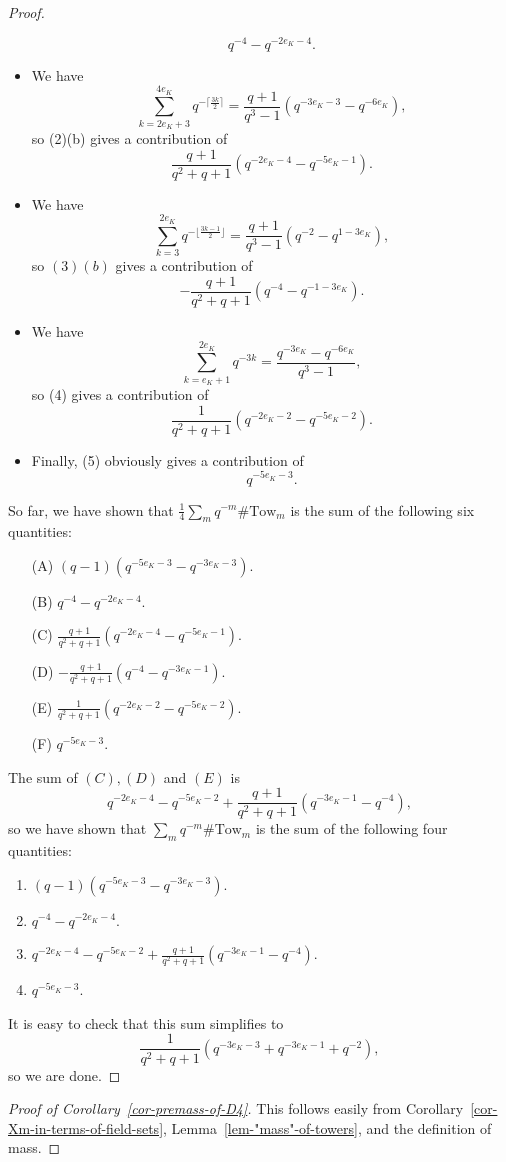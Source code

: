 \documentclass[11pt]{amsart}
\theoremstyle{theorem}
\theoremstyle{example}
\theoremstyle{definition}
\numberwithin{theorem}{section}
\numberwithin{theorem}{section}
\newcommand{\Tow}{\mathrm{Tow}}
\begin{document}
\begin{proof}
\begin{itemize}
        $$
        q^{-4} - q^{-2e_K - 4}.
        $$
        \item We have 
        $$
        \sum_{k=2e_K + 3}^{4e_K}q^{-\lceil\frac{3k}{2}\rceil} = \frac{q+1}{q^3-1}(q^{-3e_K - 3} - q^{-6e_K}),
        $$
        so (2)(b) gives a contribution of 
        $$
        \frac{q+1}{q^2+q+1}(q^{-2e_K - 4} - q^{-5e_K - 1}).
        $$
        \item We have 
        $$
        \sum_{k=3}^{2e_K} q^{-\lfloor\frac{3k-1}{2}\rfloor} = \frac{q+1}{q^3-1}(q^{-2} - q^{1-3e_K}),
        $$
        so $(3)(b)$ gives a contribution of 
        $$
        -\frac{q+1}{q^2+q+1}(q^{-4} - q^{-1-3e_K}).
        $$
        \item We have 
        $$
        \sum_{k=e_K+1}^{2e_K} q^{-3k} = \frac{q^{-3e_K} - q^{-6e_K}}{q^3-1},
        $$
        so (4) gives a contribution of 
        $$
        \frac{1}{q^2+q+1}(q^{-2e_K - 2} - q^{-5e_K - 2}).
        $$
        \item Finally, (5) obviously gives a contribution of 
        $$
        q^{-5e_K - 3}.
        $$
    \end{itemize}
    So far, we have shown that $\frac{1}{4}\sum_m q^{-m}\#\Tow_m$ is the sum of the following six quantities:
    \begin{enumerate}
        \item[(A)] $(q-1)(q^{-5e_K - 3} - q^{-3e_K - 3})$.
        \item[(B)] $q^{-4} - q^{-2e_K - 4}$.
        \item[(C)] $\frac{q+1}{q^2+q+1}(q^{-2e_K - 4} - q^{-5e_K - 1})$.
        \item[(D)] $-\frac{q+1}{q^2+q+1}(q^{-4} - q^{-3e_K - 1})$.
        \item[(E)] $\frac{1}{q^2+q+1}(q^{-2e_K-2} - q^{-5e_K-2})$.
        \item[(F)] $q^{-5e_K - 3}$.
    \end{enumerate}
    The sum of $(C),(D)$ and $(E)$ is 
    $$
    q^{-2e_K-4} - q^{-5e_K-2} + \frac{q+1}{q^2+q+1}(q^{-3e_K - 1} - q^{-4}),
    $$
    so we have shown that $\sum_m q^{-m}\# \Tow_m$ is the sum of the following four quantities:
    \begin{enumerate}
        \item $(q-1)(q^{-5e_K - 3} - q^{-3e_K - 3})$.
        \item $q^{-4} - q^{-2e_K - 4}$.
        \item $q^{-2e_K-4} - q^{-5e_K-2} + \frac{q+1}{q^2+q+1}(q^{-3e_K - 1} - q^{-4})$.
        \item $q^{-5e_K - 3}$.
    \end{enumerate}
    It is easy to check that this sum simplifies to 
    $$
    \frac{1}{q^2+q+1}(q^{-3e_K - 3} + q^{-3e_K - 1} + q^{-2}),
    $$
    so we are done. 
\end{proof}


\begin{proof}[Proof of Corollary~\ref{cor-premass-of-D4}]
    This follows easily from Corollary~\ref{cor-Xm-in-terms-of-field-sets}, Lemma~\ref{lem-"mass"-of-towers}, and the definition of mass.
\end{proof}


\printbibliography
\end{document}
